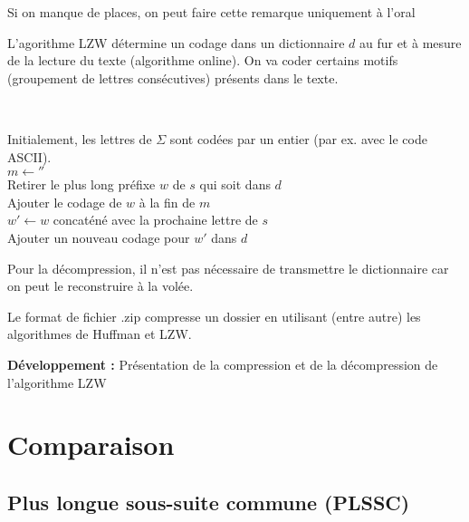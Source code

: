 \begin{com}
	Si on manque de places, on peut faire cette remarque uniquement à l'oral
\end{com}

\begin{idee}
	L'agorithme LZW détermine un codage dans un dictionnaire $d$ au fur et à mesure de la lecture du texte (algorithme online). On va coder certains motifs (groupement de lettres consécutives) présents dans le texte.
\end{idee}

\begin{algo}
	\enspace \\
	\begin{algorithm}[H]
		Initialement, les lettres de $\Sigma$ sont codées par un entier (par ex. avec le code ASCII).\\
		$m \gets ''$\\
		{
			Retirer le plus long préfixe $w$ de $s$ qui soit dans $d$\\
			Ajouter le codage de $w$ à la fin de $m$\\
			$w' \gets w$ concaténé avec la prochaine lettre de $s$\\
			Ajouter un nouveau codage pour $w'$ dans $d$
		}
	\end{algorithm}
\end{algo}

\begin{rem}
	Pour la décompression, il n'est pas nécessaire de transmettre le dictionnaire car on peut le reconstruire à la volée. 
\end{rem}

\begin{appl}
	Le format de fichier .zip compresse un dossier en utilisant (entre autre) les algorithmes de Huffman et LZW. 
\end{appl}

\textbf{Développement :} Présentation de la compression et de la décompression de l'algorithme LZW

\section{Comparaison}

\subsection{Plus longue sous-suite commune (PLSSC)}

